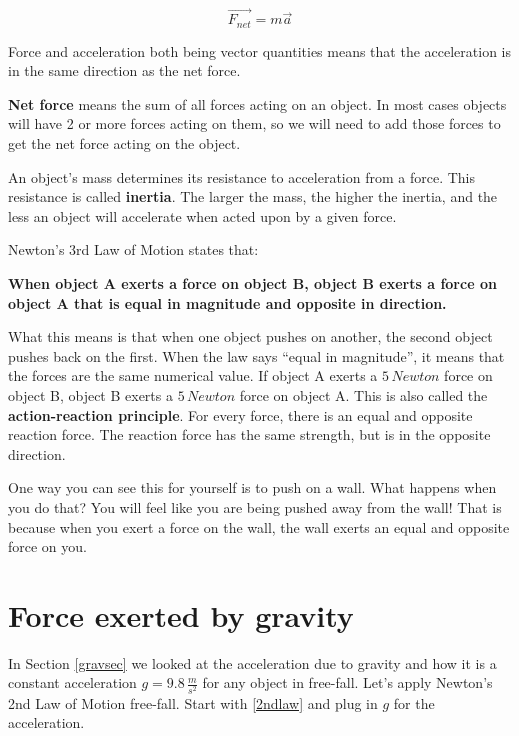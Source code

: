 \documentclass[12pt]{book}
\begin{document}
\begin{equation}
\overrightarrow{F_{net}} = m \overrightarrow{a}
\label{2ndlaw}
\end{equation} 


Force and acceleration both being vector quantities means that the acceleration is in the same direction as the net force.

\textbf{Net force} means the sum of all forces acting on an object. In most cases objects will have 2 or more forces acting on them, so we will need to add those forces to get the net force acting on the object.

An object's mass determines its resistance to acceleration from a force. This resistance is called \textbf{inertia}. The larger the mass, the higher the inertia, and the less an object will accelerate when acted upon by a given force.

\linespace

Newton's 3rd Law of Motion states that:

\hspace{10pt}

\textbf{When object A exerts a force on object B, object B exerts a force on object A that is equal in magnitude and opposite in direction.}

\linespace

What this means is that when one object pushes on another, the second object pushes back on the first. When the law says ``equal in magnitude'', it means that the forces are the same numerical value. If object A exerts a $5 \, Newton$ force on object B, object B exerts a $5 \, Newton$ force on object A. This is also called the \textbf{action-reaction principle}. For every force, there is an equal and opposite reaction force. The reaction force has the same strength, but is in the opposite direction.

One way you can see this for yourself is to push on a wall. What happens when you do that? You will feel like you are being pushed away from the wall! That is because when you exert a force on the wall, the wall exerts an equal and opposite force on you. 



\section{Force exerted by gravity}

In Section \ref{gravsec} we looked at the acceleration due to gravity and how it is a constant acceleration $g = 9.8 \, \frac{m}{s^2}$ for any object in free-fall. Let's apply Newton's 2nd Law of Motion free-fall. Start with \ref{2ndlaw} and plug in $g$ for the acceleration.
\end{document}
